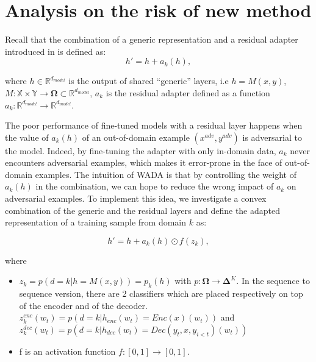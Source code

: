\documentclass[12pt,times,a4paper,twoside]{article}
\newcommand{\fyTodo}[1]{\Todo[FY:]{\textcolor{orange}{#1}}}
\newcommand{\fyDone}[1]{\done[FY]\Todo[FY:]{\textcolor{orange}{#1}}}
\theoremstyle{definition}
\newcommand{\R}{\ensuremath{\mathbb{R}}}
\begin{document}
\section*{Analysis on the risk of new method}

Recall that the combination of a generic representation and a residual adapter introduced in \citep{BapnaXX} is defined as:
\begin{equation}
  h' = h + a_k(h) \label{eq:residual-adapter},
\end{equation}

where $h \in \R^{d_{model}}$ is the output of shared ``generic'' layers, i.e $h=M(x,y)$, $M: \mathbb{X} \times \mathbb{Y} \rightarrow \mathbf{\Omega}\subset \R^{d_{model}}$, $a_k$ is the residual adapter defined as a function $a_k: \R^{d_{model}} \rightarrow \R^{d_{model}}$.\fyTodo{$\R^d$ might be enough.}

The poor performance of fine-tuned models with a residual layer happens when the value of $a_k(h)$ of an out-of-domain example $(x^{adv}, y^{adv})$ is adversarial to the model. Indeed, by fine-tuning the adapter with only in-domain data, $a_k$ never encounters adversarial examples, which makes it error-prone in the face of out-of-domain examples. The intuition of WADA is that by controlling the weight of $a_k(h)$ in the combination, we can hope to reduce the wrong impact of $a_k$ on adversarial examples. To implement this idea, we  investigate a convex combination\fyDone{Entre $h$ et $h + a h$} of the generic and the residual layers and define the adapted representation of a training sample from domain $k$ as: \fyTodo{Use real labels in equation}

\begin{equation}
  h' = h + a_k(h) \odot f(z_k), 
\label{eq:2}
\end{equation}

\noindent{}where
\begin{itemize}
\item $z_k = p(d=k | h=M(x,y)) = p_k(h)$ with $p: \mathbf{\Omega} \rightarrow \mathbf{\Delta}^{K}$\fyTodo{This is an overkill}. In the sequence to sequence version, there are 2 classifiers which are placed respectively on top of the encoder and of the decoder.
$z^{enc}_k(w_t) = p(d=k| h_{enc}(w_t)=Enc(x)(w_t))$ and $z^{dec}_k(w_t) = p(d=k| h_{dec}(w_t)=Dec(y_t,x,y_{i<t})(w_t))$
\fyTodo{Attention à $x$ et $y$}
\item f is an activation function $f: [0,1] \rightarrow [0,1]$.
\end{itemize}
\end{document}
